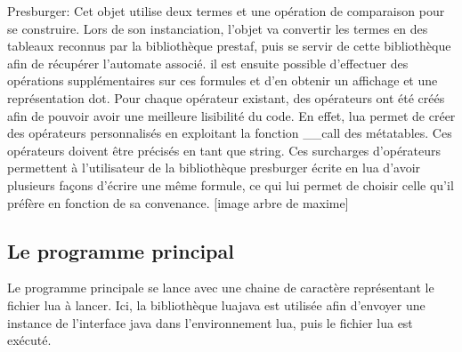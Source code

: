 Presburger: Cet objet utilise deux termes et une opération de comparaison pour se construire.
Lors de son instanciation, l’objet va convertir les termes en des tableaux reconnus par la bibliothèque prestaf, puis se servir de cette bibliothèque afin de récupérer l’automate associé. il est ensuite possible d’effectuer des opérations supplémentaires sur ces formules et d’en obtenir un affichage et une représentation dot. 
Pour chaque opérateur existant, des opérateurs ont été créés afin de pouvoir avoir une meilleure lisibilité du code. En effet, lua permet de créer des opérateurs personnalisés en exploitant la fonction \_\_call des métatables. Ces opérateurs doivent être précisés en tant que string. Ces surcharges d’opérateurs permettent à l’utilisateur de la bibliothèque presburger écrite en lua d’avoir plusieurs façons d’écrire une même formule, ce qui lui permet de choisir celle qu’il préfère en fonction de sa convenance. 
 [image arbre de maxime]

\subsection{Le programme principal}

Le programme principale se lance avec une chaine de caractère représentant le fichier lua à lancer. Ici, la bibliothèque luajava est utilisée afin d’envoyer une instance de l’interface java dans l’environnement lua, puis le fichier lua est exécuté.
